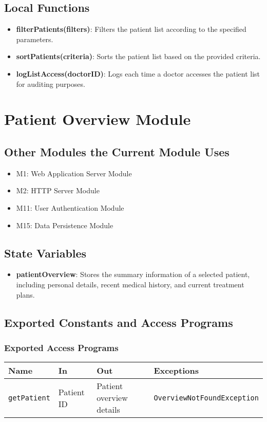 \documentclass[12pt, titlepage]{article}
\begin{document}
\subsection{Local Functions}
\begin{itemize}
\item \textbf{filterPatients(filters)}: Filters the patient list according to the specified parameters.
\item \textbf{sortPatients(criteria)}: Sorts the patient list based on the provided criteria.
\item \textbf{logListAccess(doctorID)}: Logs each time a doctor accesses the patient list for auditing purposes.
\end{itemize}
\section{Patient Overview Module}

\subsection{Other Modules the Current Module Uses}
\begin{itemize}
\item M1: Web Application Server Module
\item M2: HTTP Server Module
\item M11: User Authentication Module
\item M15: Data Persistence Module
\end{itemize}

\subsection{State Variables}
\begin{itemize}
\item \textbf{patientOverview}: Stores the summary information of a selected patient, including personal details, recent medical history, and current treatment plans.
\end{itemize}

\subsection{Exported Constants and Access Programs}
\subsubsection{Exported Access Programs}
\begin{tabular}{|l|l|l|l|}
    \hline
    \textbf{Name} & \textbf{In} & \textbf{Out} & \textbf{Exceptions} \\
    \hline 
    \texttt{getPatient} & Patient ID & Patient overview details & \texttt{OverviewNotFoundException} \\
    \hline
\end{tabular}
\end{document}
